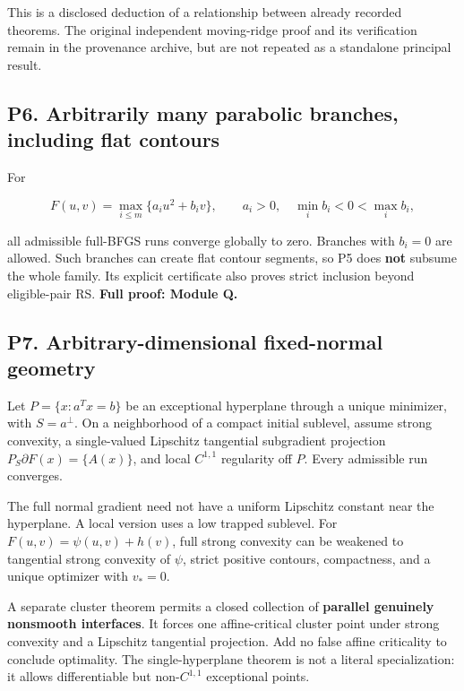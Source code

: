 This is a disclosed deduction of a relationship between already recorded theorems. The original independent moving-ridge proof and its verification remain in the provenance archive, but are not repeated as a standalone principal result.

\subsection{P6. Arbitrarily many parabolic branches, including flat contours}\label{p6.-arbitrarily-many-parabolic-branches-including-flat-contours}

For

\[F(u,v)=\max_{i\le m}\{a_i u^2+b_iv\},\qquad a_i>0,
\quad\min_i b_i<0<\max_i b_i,\]

all admissible full-BFGS runs converge globally to zero. Branches with \(b_i=0\) are allowed. Such branches can create flat contour segments, so P5 does \textbf{not} subsume the whole family. Its explicit certificate also proves strict inclusion beyond eligible-pair RS. \textbf{Full proof: Module Q.}

\subsection{P7. Arbitrary-dimensional fixed-normal geometry}\label{p7.-arbitrary-dimensional-fixed-normal-geometry}

Let \(P=\{x:a^Tx=b\}\) be an exceptional hyperplane through a unique minimizer, with \(S=a^\perp\). On a neighborhood of a compact initial sublevel, assume strong convexity, a single-valued Lipschitz tangential subgradient projection \(P_S\partial F(x)=\{A(x)\}\), and local \(C^{1,1}\) regularity off \(P\). Every admissible run converges.

The full normal gradient need not have a uniform Lipschitz constant near the hyperplane. A local version uses a low trapped sublevel. For \(F(u,v)=\psi(u,v)+h(v)\), full strong convexity can be weakened to tangential strong convexity of \(\psi\), strict positive contours, compactness, and a unique optimizer with \(v_*=0\).

A separate cluster theorem permits a closed collection of \textbf{parallel genuinely nonsmooth interfaces}. It forces one affine-critical cluster point under strong convexity and a Lipschitz tangential projection. Add no false affine criticality to conclude optimality. The single-hyperplane theorem is not a literal specialization: it allows differentiable but non-\(C^{1,1}\) exceptional points.

